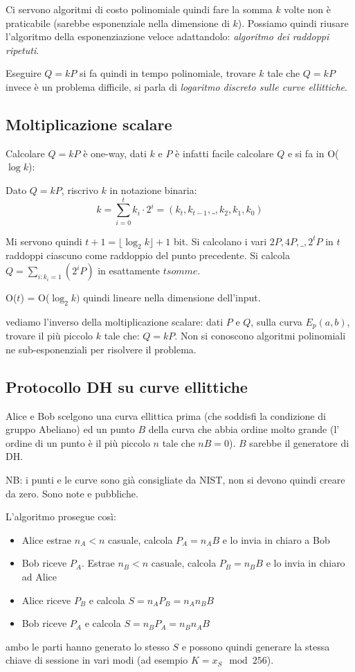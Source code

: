 Ci servono algoritmi di costo polinomiale quindi fare la somma $k$ volte non è praticabile (sarebbe esponenziale nella dimensione di $k$).
Possiamo quindi riusare l'algoritmo della esponenziazione veloce adattandolo: \emph{algoritmo dei raddoppi ripetuti}.

Eseguire $Q = kP$ si fa quindi in tempo polinomiale, trovare $k$ tale che $Q = kP$ invece è un problema difficile, si parla di \emph{logaritmo discreto sulle curve ellittiche}.

\subsection{Moltiplicazione scalare}
Calcolare $Q = kP$ è one-way, dati $k$ e $P$ è infatti facile calcolare $Q$ e si fa in O($\log k$):

Dato $Q = kP$, riscrivo $k$ in notazione binaria: 
$$ k = \sum_{i=0}^{t}k_i \cdot 2^i = (k_t,k_{t-1},\_,k_2,k_1,k_0) $$

Mi servono quindi $t+1 = \lfloor \log_2 k \rfloor + 1$ bit.
Si calcolano i vari $2P, 4P, \_, 2^tP$ in $t$ raddoppi ciascuno come raddoppio del punto precedente.
Si calcola $Q = \sum_{i : k_i = 1} (2^iP)$ in esattamente $t somme$.

O($t$) = O($\log_2 k)$ quindi lineare nella dimensione dell'input.

vediamo l'inverso della moltiplicazione scalare: dati $P$ e $Q$, sulla curva $E_p(a,b)$, trovare il più piccolo $k$ tale che: $Q = kP$. Non si conoscono algoritmi polinomiali ne sub-esponenziali per risolvere il problema.

\subsection{Protocollo DH su curve ellittiche}
Alice e Bob scelgono una curva ellittica prima (che soddisfi la condizione di gruppo Abeliano) ed un punto $B$ della curva che abbia ordine molto grande (l' ordine di un punto è il più piccolo $n$ tale che $nB=0$). $B$ sarebbe il generatore di DH.

NB: i punti e le curve sono già consigliate da NIST, non si devono quindi creare da zero.
Sono note e pubbliche.

L'algoritmo prosegue così:
\begin{itemize}
    \item Alice estrae $n_A < n$ casuale, calcola $P_A = n_AB$ e lo invia in chiaro a Bob
    \item Bob riceve $P_A$. Estrae $n_B < n$ casuale, calcola $P_B = n_BB$ e lo invia in chiaro ad Alice
    \item Alice riceve $P_B$ e calcola $S = n_AP_B = n_An_BB$
    \item Bob riceve $P_A$ e calcola $S = n_BP_A = n_Bn_AB$
\end{itemize}
ambo le parti hanno generato lo stesso $S$ e possono quindi generare la stessa chiave di sessione in vari modi (ad esempio $K = x_S \mod 256$).


